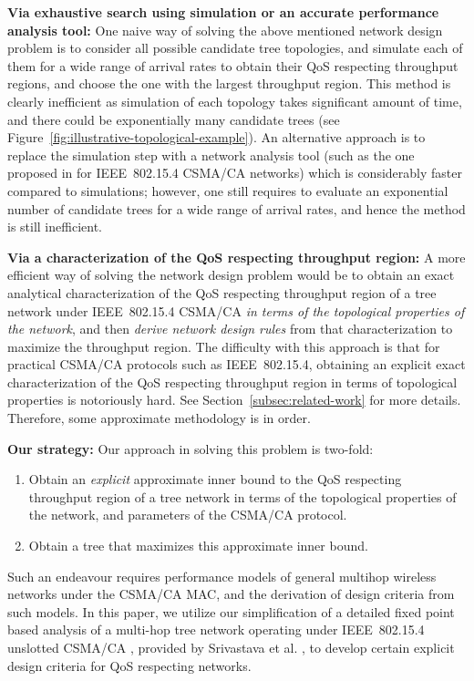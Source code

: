 \documentclass[12pt, draftclsnofoot, onecolumn]{IEEEtran}
\newcommand{\gap}{\vspace{2mm}}
\begin{document}
\gap
\noindent
\textbf{Via exhaustive search using simulation or an accurate performance analysis tool:} One naive way of solving the above mentioned network design problem is to consider all possible candidate tree topologies, and simulate each of them for a wide range of arrival rates to obtain their QoS respecting throughput regions, and choose the one with the largest throughput region. This method is clearly inefficient as simulation of each topology takes significant amount of time, and there could be exponentially many candidate trees (see Figure~\ref{fig:illustrative-topological-example}). An alternative approach is to replace the simulation step with a network analysis tool (such as the one proposed in \cite{srivastava} for IEEE~802.15.4 CSMA/CA networks) which is considerably faster compared to simulations; however, one still requires to evaluate an exponential number of candidate trees for a wide range of arrival rates, and hence the method is still inefficient.

\gap
\noindent
\textbf{Via a characterization of the QoS respecting throughput region:} A more efficient way of solving the network design problem would be to obtain an exact analytical characterization of the QoS respecting throughput region of a tree network under IEEE~802.15.4 CSMA/CA \emph{in terms of the topological properties of the network}, and then \emph{derive network design rules} from that characterization to maximize the throughput region. The difficulty with this approach is that for practical CSMA/CA protocols such as IEEE~802.15.4, obtaining an explicit exact characterization of the QoS respecting throughput region in terms of topological properties is notoriously hard. See Section~\ref{subsec:related-work} for more details. Therefore, some approximate methodology is in order.

\gap
\noindent
\textbf{Our strategy:} Our approach in solving this problem is two-fold:
\begin{enumerate}
\item Obtain an \emph{explicit} approximate inner bound to the QoS respecting throughput region of a tree network in terms of the topological properties of the network, and parameters of the CSMA/CA protocol. 
\item Obtain a tree that maximizes this approximate inner bound.
\end{enumerate}
Such an endeavour requires performance models of general multihop wireless networks under the CSMA/CA MAC, and the derivation of design criteria from such models. In this paper, we utilize our simplification of a detailed fixed point based analysis of a multi-hop tree network operating under IEEE~802.15.4 unslotted CSMA/CA \cite{IEEE}, provided by Srivastava et al. \cite{srivastava}, to develop certain explicit design criteria for QoS respecting networks.
\end{document}
